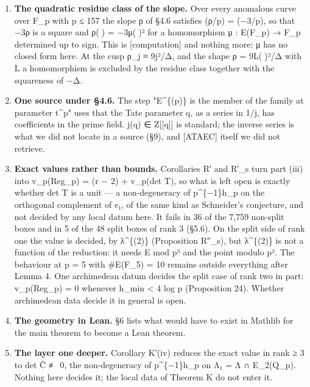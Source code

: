 \documentclass[11pt,a4paper]{article}
\theoremstyle{named}
\begin{document}
\begin{enumerate}[leftmargin=1.4em,itemsep=.2em,topsep=.3em]
\item \textbf{The quadratic residue class of the slope.} Over every anomalous curve over F\_p with p ≤ 157 the slope ρ of §4.6 satisfies (ρ/p) = (−3/p), so that −3ρ is a square and ρ() = −3μ()² for a homomorphism μ : E(F\_p) → F\_p determined up to sign. This is [computation] and nothing more; μ has no closed form here. At the cusp ρ\_j ≈ 9j²/Δ, and the shape ρ = 9L()²/Δ with L a homomorphism is excluded by the residue class together with the squareness of −Δ.
\item \textbf{One source under §4.6.} The step "E\textasciicircum{}\{(p)\} is the member of the family at parameter t\textasciicircum{}p" uses that the Tate parameter q, as a series in 1/j, has coefficients in the prime field. j(q) ∈ Z[[q]] is standard; the inverse series is what we did not locate in a source (§9), and [ATAEC] itself we did not retrieve.
\item \textbf{Exact values rather than bounds.} Corollaries R′ and R′\_s turn part (iii) into v\_p(Reg\_p) = (r − 2) + v\_p(det T), so what is left open is exactly whether det T is a unit — a non-degeneracy of p\textasciicircum{}\{−1\}h\_p on the orthogonal complement of e₁, of the same kind as Schneider's conjecture, and not decided by any local datum here. It fails in 36 of the 7,759 non-split boxes and in 5 of the 48 split boxes of rank 3 (§5.6). On the split side of rank one the value is decided, by λ\textasciicircum{}\{(2)\} (Proposition R″\_s), but λ\textasciicircum{}\{(2)\} is not a function of the reduction: it needs E mod p³ and the point modulo p². The behaviour at p = 5 with \#E(F\_5) = 10 remains outside everything after Lemma 4. One archimedean datum decides the split case of rank two in part: v\_p(Reg\_p) = 0 whenever h\_min \textless{} 4 log p (Proposition 24). Whether archimedean data decide it in general is open.
\item \textbf{The geometry in Lean.} §6 lists what would have to exist in Mathlib for the main theorem to become a Lean theorem.
\item \textbf{The layer one deeper.} Corollary K′(iv) reduces the exact value in rank ≥ 3 to det Ĉ ≢ 0, the non-degeneracy of p\textasciicircum{}\{−1\}h\_p on Λ₁ = Λ ∩ E\_2(Q\_p). Nothing here decides it; the local data of Theorem K do not enter it.

\end{enumerate}
\end{document}
